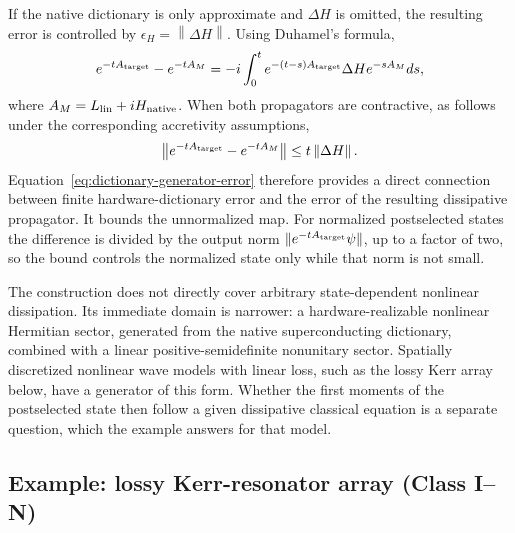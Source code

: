 \documentclass[pra,twocolumn,superscriptaddress,nofootinbib,floatfix]{revtex4-2}
\theoremstyle{remark}
\newcommand{\revcolor}{\color{blue}}
\DeclareRobustCommand{\rev}[1]{{\revcolor #1}}
\begin{document}
\rev{If the native dictionary is only approximate and \(\Delta H\) is omitted, the resulting error is controlled by \(\epsilon_H=\left\|\Delta H\right\|.\)} Using Duhamel's formula,
\begin{align}
e^{-tA_{\rm target}}-e^{-tA_M}=-i\int_0^te^{-(t-s)A_{\rm target}}\Delta He^{-sA_M}ds,
\end{align}
\rev{where \(A_M=L_{\rm lin}+iH_{\rm native}\).} When both propagators are contractive, as follows under the corresponding accretivity assumptions,
\begingroup\revcolor
\begin{align}
\left\|e^{-tA_{\rm target}}-e^{-tA_M}\right\|\leq t\left\|\Delta H\right\|.
\label{eq:dictionary-generator-error}
\end{align}
\endgroup
Equation~\eqref{eq:dictionary-generator-error} therefore provides a direct connection between finite hardware-dictionary error and the error of the resulting dissipative propagator. \rev{It bounds the unnormalized map.} \rev{For normalized postselected states the difference is divided by the output norm \(\|e^{-tA_{\rm target}}\psi\|\), up to a factor of two, so the bound controls the normalized state only while that norm is not small.}

The construction does not directly cover arbitrary state-dependent nonlinear dissipation. Its immediate domain is narrower: a hardware-realizable nonlinear Hermitian sector, generated from the native superconducting dictionary, combined with a linear positive-semidefinite nonunitary sector. \rev{Spatially discretized nonlinear wave models with linear loss, such as the lossy Kerr array below, have a generator of this form.} \rev{Whether the first moments of the postselected state then follow a given dissipative classical equation is a separate question, which the example answers for that model.}

\subsection*{\rev{Example: lossy Kerr-resonator array (Class I--N)}}
\end{document}
